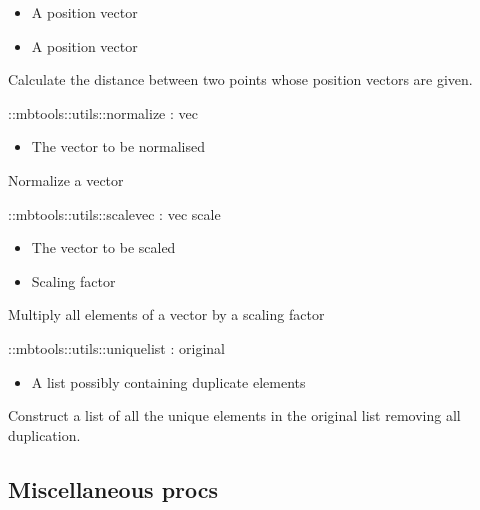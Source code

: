 \begin{itemize}
\item {} A position vector
\item {} A position vector
\end{itemize}
Calculate the distance between two points whose position vectors are given.
\begin{code}    
  ::mbtools::utils::normalize : vec
\end{code}
\begin{itemize}
\item {} The vector to be normalised
\end{itemize}
Normalize a vector
\begin{code}    
  ::mbtools::utils::scalevec : vec scale
\end{code}
\begin{itemize}
\item {} The vector to be scaled
\item {} Scaling factor
\end{itemize}
Multiply all elements of a vector by a scaling factor
\begin{code}    
  ::mbtools::utils::uniquelist : original
\end{code}
\begin{itemize}
\item {} A list possibly containing duplicate elements
\end{itemize}
Construct a list of all the unique elements in the original list
removing all duplication.

\subsection{Miscellaneous procs}

